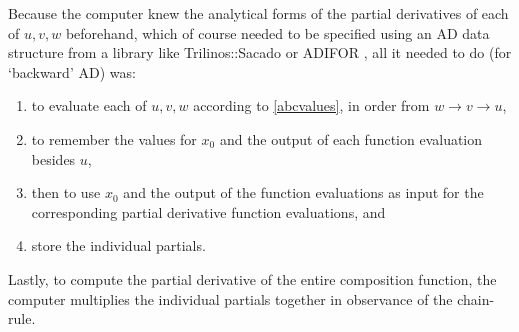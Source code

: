 \documentclass[preprint,12pt]{elsarticle}
\begin{document}
Because the computer knew the analytical forms of the partial derivatives of each of $u,v,w$ beforehand, which of course needed to be specified using an AD data structure from a library like Trilinos::Sacado \cite{trilinos} or ADIFOR \cite{bischof1995adifor},
all it needed to do (for `backward' AD) was:
\begin{enumerate}
\item to evaluate each of $u,v,w$ according to \ref{abcvalues}, in order from $w \rightarrow
v \rightarrow u$, 
\item to remember the values for $x_0$ and the output of each function evaluation besides  $u$, 
\item then to use $x_0$ and the output of the function evaluations as input for the corresponding partial
derivative function  evaluations, and
\item store the individual partials.
\end{enumerate}
Lastly, to compute the partial derivative of the entire composition function, the computer multiplies
the individual partials together in observance of the chain-rule.  
\end{document}
